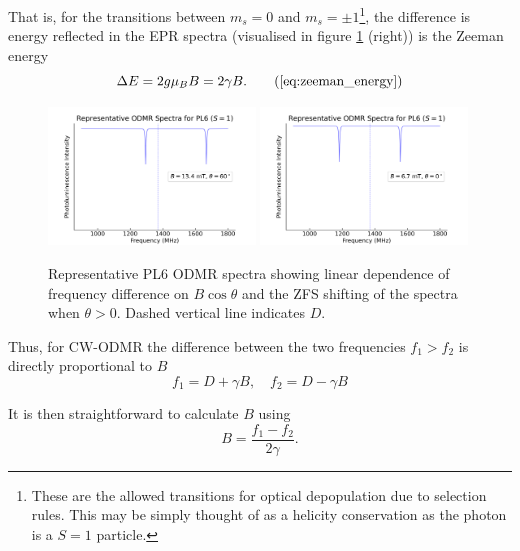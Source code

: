     That is, for the transitions between $m_s=0$ and $m_s = \pm 1$\footnote{These are the allowed transitions for optical depopulation due to selection rules. This may be simply thought of as a helicity conservation as the photon is a $S=1$ particle.}, the difference is energy reflected in the EPR spectra (visualised in figure \ref{fig:linear_zeeman} (right)) is the Zeeman energy
\begin{equation}
	\Delta E = 2g \mu_B B =  2\gamma B.
	\tag{\ref{eq:zeeman_energy}}
\end{equation}
\begin{figure}[H]
    \begin{center}
        \includegraphics[width=0.49\textwidth]{figures/ODMR-s1magnet-2.png}
        \includegraphics[width=0.49\textwidth]{figures/ODMR-s1magnet-3.png}

    \end{center}
    \caption{Representative PL6 ODMR spectra showing linear dependence of frequency difference on $B\cos\theta$ and the ZFS shifting of the spectra when $\theta > 0$. Dashed vertical line indicates $D$.}\label{fig:linear_zeeman}
\end{figure}
Thus, for CW-ODMR the difference between the two frequencies $f_1 > f_2$ is directly proportional to $B$
\begin{equation}
	f_1 = D + \gamma B,  \quad f_2 = D - \gamma B
	\label{eq:}
\end{equation}

It is then straightforward to calculate $B$ using
\begin{equation}
	B = \frac{f_1 - f_2}{2 \gamma}.
	\label{eq:s1_parallel_magnetometry}
\end{equation}


